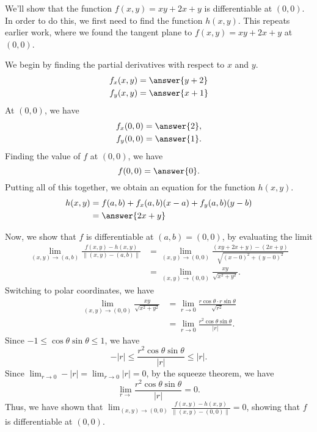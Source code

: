 \documentclass{ximera}
\begin{document}
\begin{example}
We'll show that the function $f(x,y) = xy+2x+y$ is differentiable at $(0,0)$. In order to do this, we first need to find the function $h(x,y)$. This repeats earlier work, where we found the tangent plane to $f(x,y) = xy+2x+y$ at $(0,0)$.

We begin by finding the partial derivatives with respect to $x$ and $y$.
\begin{align*}
f_x(x,y) &= \answer{y+2}\\
f_y(x,y) &= \answer{x+1}
\end{align*} 
At $(0,0)$, we have
\begin{align*}
f_x(0,0) &= \answer{2},\\
f_y(0,0) &= \answer{1}.
\end{align*} 
Finding the value of $f$ at $(0,0)$, we have
\[
f(0,0) = \answer{0}.
\]
Putting all of this together, we obtain an equation for the function $h(x,y)$.
\begin{align*}
h(x,y) &=f(a,b)+f_x(a,b)(x-a)+f_y(a,b)(y-b)\\
&= \answer{2x+y}
\end{align*}

Now, we show that $f$ is differentiable at $(a,b)=(0,0)$, by evaluating the limit
\begin{align*}
\lim_{(x,y)\rightarrow (a,b)}\frac{f(x,y) - h(x,y)}{\|(x,y)-(a,b)\|}  &= \lim_{(x,y)\rightarrow (0,0)}\frac{(xy+2x+y) - (2x+y)}{\sqrt{(x-0)^2+(y-0)^2}}\\
&= \lim_{(x,y)\rightarrow (0,0)}\frac{xy}{\sqrt{x^2+y^2}}.
\end{align*}
Switching to polar coordinates, we have
\begin{align*}
\lim_{(x,y)\rightarrow (0,0)}\frac{xy}{\sqrt{x^2+y^2}} &= \lim_{r\rightarrow 0}\frac{r\cos\theta\cdot r\sin\theta}{\sqrt{r^2}}\\
&=  \lim_{r\rightarrow 0}\frac{r^2\cos\theta\sin\theta}{|r|}.
\end{align*}
Since $-1\leq \cos\theta\sin\theta \leq 1$, we have
\[
-|r|\leq \frac{r^2\cos\theta\sin\theta}{|r|} \leq |r|.
\]
Since $\lim_{r\rightarrow 0} -|r| = \lim_{r\rightarrow 0} |r| = 0$, by the squeeze theorem, we have
\[
\lim_{r\rightarrow}\frac{r^2\cos\theta\sin\theta}{|r|} = 0.
\]
Thus, we have shown that $\lim_{(x,y)\rightarrow (0,0)}\frac{f(x,y) - h(x,y)}{\|(x,y)-(0,0)\|}=0$, showing that $f$ is differentiable at $(0,0)$. 
\end{example}
\end{document}
